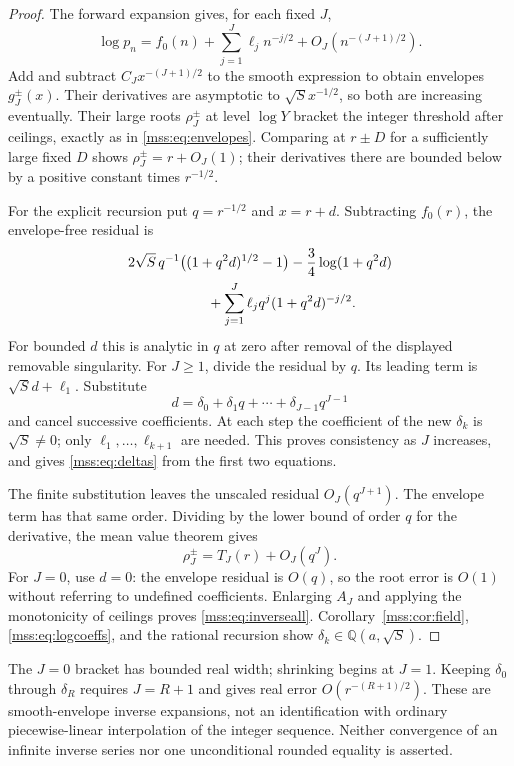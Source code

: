 \documentclass[11pt,letterpaper]{article}
\numberwithin{equation}{section}
\theoremstyle{definition}\newtheorem{definition}[theorem]{Definition}
\theoremstyle{remark}\newtheorem{remark}[theorem]{Remark}
\begin{document}
\begin{proof}
The forward expansion gives, for each fixed $J$,
\[
\log p_n=f_0(n)+\sum_{j=1}^J\ell_j n^{-j/2}
+O_J(n^{-(J+1)/2}).
\]
Add and subtract $C_Jx^{-(J+1)/2}$ to the smooth expression to obtain envelopes $g_J^\pm(x)$. Their derivatives are asymptotic to $\sqrt S x^{-1/2}$, so both are increasing eventually. Their large roots $\rho_J^\pm$ at level $\log Y$ bracket the integer threshold after ceilings, exactly as in \eqref{mss:eq:envelopes}. Comparing at $r\pm D$ for a sufficiently large fixed $D$ shows $\rho_J^\pm=r+O_J(1)$; their derivatives there are bounded below by a positive constant times $r^{-1/2}$.

For the explicit recursion put $q=r^{-1/2}$ and $x=r+d$. Subtracting $f_0(r)$, the envelope-free residual is
\begin{align}\label{mss:eq:inverseresidual}
&2\sqrt S\,q^{-1}\bigl((1+q^2d)^{1/2}-1\bigr)
-\frac34\log(1+q^2d)\\
&\hspace{20mm}+\sum_{j=1}^J\ell_jq^j(1+q^2d)^{-j/2}.\nonumber
\end{align}
For bounded $d$ this is analytic in $q$ at zero after removal of the displayed removable singularity. For $J\ge1$, divide the residual by $q$. Its leading term is $\sqrt S d+\ell_1$. Substitute
\[
d=\delta_0+\delta_1q+\cdots+\delta_{J-1}q^{J-1}
\]
and cancel successive coefficients. At each step the coefficient of the new $\delta_k$ is $\sqrt S\ne0$; only $\ell_1,\ldots,\ell_{k+1}$ are needed. This proves consistency as $J$ increases, and gives \eqref{mss:eq:deltas} from the first two equations.

The finite substitution leaves the unscaled residual $O_J(q^{J+1})$. The envelope term has that same order. Dividing by the lower bound of order $q$ for the derivative, the mean value theorem gives
\[
\rho_J^\pm=T_J(r)+O_J(q^J).
\]
For $J=0$, use $d=0$: the envelope residual is $O(q)$, so the root error is $O(1)$ without referring to undefined coefficients. Enlarging $A_J$ and applying the monotonicity of ceilings proves \eqref{mss:eq:inverseall}. Corollary~\ref{mss:cor:field}, \eqref{mss:eq:logcoeffs}, and the rational recursion show $\delta_k\in\mathbb Q(a,\sqrt S)$.
\end{proof}
The $J=0$ bracket has bounded real width; shrinking begins at $J=1$. Keeping $\delta_0$ through $\delta_R$ requires $J=R+1$ and gives real error $O(r^{-(R+1)/2})$. These are smooth-envelope inverse expansions, not an identification with ordinary piecewise-linear interpolation of the integer sequence. Neither convergence of an infinite inverse series nor one unconditional rounded equality is asserted.
\end{document}
